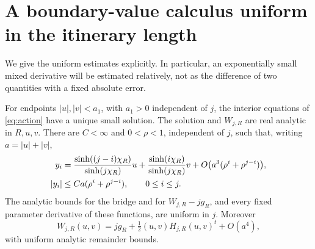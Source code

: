 \section{A boundary-value calculus uniform in the itinerary length}
\label{sec:action}
We give the uniform estimates explicitly. In particular, an exponentially
small mixed derivative will be estimated relatively, not as the difference
of two quantities with a fixed absolute error.

\begin{lemma}\label{lem:bridge}
For endpoints $|u|,|v|<a_1$, with $a_1>0$ independent of $j$, the
interior equations of \eqref{eq:action} have a unique small solution.
The solution and $W_{j,R}$ are real analytic in $R,u,v$. There are
$C<\infty$ and $0<\rho<1$, independent of $j$, such that, writing
$a=|u|+|v|$,
\begin{align}\label{eq:bridge-estimates}
 y_i&=\frac{\sinh((j-i)\chi_R)}{\sinh(j\chi_R)}u
       +\frac{\sinh(i\chi_R)}{\sinh(j\chi_R)}v
       +O\bigl(a^3(\rho^i+\rho^{j-i})\bigr),\\
 |y_i|&\le Ca(\rho^i+\rho^{j-i}),\qquad 0\le i\le j.\notag
\end{align}
The analytic bounds for the bridge and for $W_{j,R}-jg_R$, and
every fixed parameter derivative of these functions, are uniform in $j$. Moreover
\begin{equation}\label{eq:action-jet}
 W_{j,R}(u,v)=jg_R+\tfrac12(u,v)H_{j,R}(u,v)^t+O(a^4),
\end{equation}
with uniform analytic remainder bounds.
\end{lemma}
